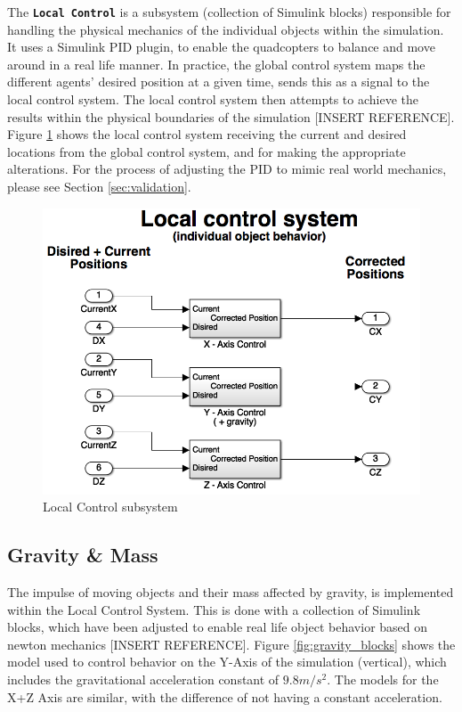 The \textbf{\texttt{Local Control}} is a subsystem (collection of Simulink blocks) responsible for handling the physical mechanics of the individual objects within the simulation. It uses a Simulink PID plugin, to enable the quadcopters to balance and move around in a real life manner. In practice, the global control system maps the different agents' desired position at a given time, sends this as a signal to the local control system. The local control system then attempts to achieve the results within the physical boundaries of the simulation [INSERT REFERENCE]. Figure \ref{fig:local_control} shows the local control system receiving the current and desired locations from the global control system, and for making the appropriate alterations. For the process of adjusting the PID to mimic real world mechanics, please see Section \ref{sec:validation}.

\begin{figure}
	\centering
	\includegraphics[width=.7\columnwidth]{figures/local_control}
  	\caption{\label{fig:local_control}Local Control subsystem}
\end{figure}

\subsection{Gravity \& Mass}
\label{sec:sim_gravity}

The impulse of moving objects and their mass affected by gravity, is implemented within the Local Control System. This is done with a collection of Simulink blocks, which have been adjusted to enable real life object behavior based on newton mechanics [INSERT REFERENCE]. Figure \ref{fig:gravity_blocks} shows the model used to control behavior on the Y-Axis of the simulation (vertical), which includes the gravitational acceleration constant of ${9.8m/s^2}$. The models for the X+Z Axis are similar, with the difference of not having a constant acceleration.

